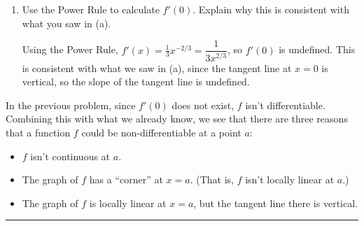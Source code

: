 \documentclass{article}
\begin{document}
\begin{enumerate}
\begin{enumerate}
\begin{solution}
      The tangent line at $x=0$ appears vertical. Vertical lines have undefined slope.
    \end{solution}

  \item
    \begin{problem}[\vfill\newpage]
      Use the Power Rule to calculate $f'(0)$. Explain why this is consistent with what you saw in (a). 
    \end{problem}

    \begin{solution}
      Using the Power Rule, $f'(x) = \frac{1}{3}x^{-2/3} = \dfrac{1}{3x^{2/3}}$, so
      $f'(0)$ is undefined. This is consistent with what we saw in (a), since the tangent
      line at $x=0$ is vertical, so the slope of the tangent line is undefined.
    \end{solution}

  \end{enumerate}

\end{enumerate}
\begin{problemonly}
  In the previous problem, since $f'(0)$ does not exist, $f$ isn't differentiable. Combining this with what we already know, we see that there are three reasons that a function $f$ could be non-differentiable at a point $a$:

  \begin{itemize}
  \item $f$ isn't continuous at $a$.
  \item The graph of $f$ has a ``corner'' at $x = a$. (That is, $f$ isn't locally linear at $a$.)
  \item The graph of $f$ is locally linear at $x = a$, but the tangent line there is vertical.
  \end{itemize}

  \begin{center}
    \rule{5in}{0.4pt}
  \end{center}
\end{problemonly}
\end{document}

